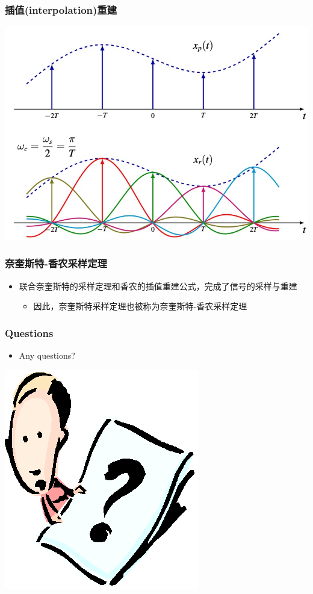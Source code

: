 \documentclass[CJKutf8,dvipsnames,table]{beamer}
\begin{document}
\begin{CJK*}{UTF8}{song}
  \begin{frame}
    \frametitle{插值(interpolation)重建}
    \begin{center}
      \includegraphics[scale=.4]{reconstruction}
    \end{center}
  \end{frame} 
  
  \begin{frame}
    \frametitle{奈奎斯特-香农采样定理}
	\begin{itemize}
	\item 联合奈奎斯特的采样定理和香农的插值重建公式，完成了信号的采样与重建
		\begin{itemize}
		\item 因此，奈奎斯特采样定理也被称为奈奎斯特-香农采样定理
		\end{itemize}
	\end{itemize}
  \end{frame}   
  
  \begin{frame}
    \frametitle{Questions}
    \begin{itemize}
    \item Any questions?
    \end{itemize}
    \begin{center}
      \includegraphics[scale=.5]{question}
    \end{center}
  \end{frame} 


\end{CJK*}
\end{document}
